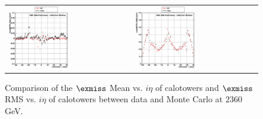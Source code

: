 \begin{figure}[h!]
 \centering
 \begin{tabular}{ll}
  \includegraphics[width=0.5\textwidth]{plots_DataVsMC_MB_2360GeV/g_calometPxMean_vs_ieta_2360.eps} &
  \includegraphics[width=0.5\textwidth]{plots_DataVsMC_MB_2360GeV/g_calometPxRMS_vs_ieta_2360.eps} \\
 \end{tabular}
 \caption{\small Comparison of the $\exmiss$ Mean vs. $i\eta$ of calotowers and $\exmiss$ RMS vs. $i\eta$ of calotowers between 
          data and Monte Carlo at $2360$ GeV.\label{fig:METx_MeanRMS_vs_ieta_2360}}
\end{figure}

